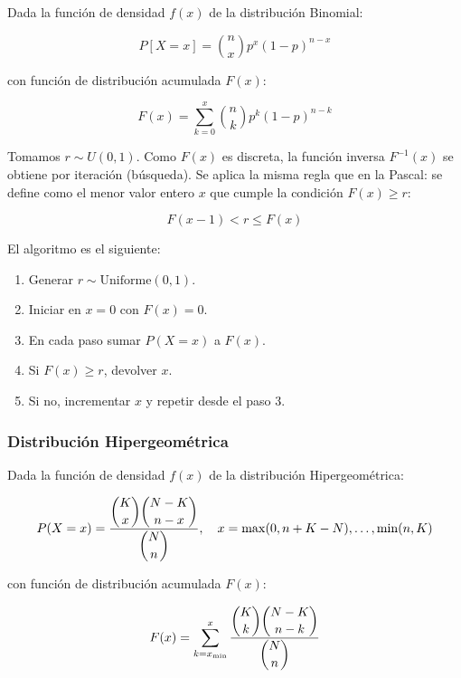 \documentclass{article}
\begin{document}
Dada la función de densidad $f(x)$ de la distribución Binomial:

\begin{equation}
    P[X = x] = \binom{n}{x} p^x (1-p)^{n-x}
\end{equation}

con función de distribución acumulada $F(x)$:

\begin{equation}
    F(x) = \sum_{k=0}^{x} \binom{n}{k} p^k (1-p)^{n-k}
\end{equation}

Tomamos $r \sim U(0,1)$. Como $F(x)$ es discreta, la función inversa $F^{-1}(x)$ se obtiene
por iteración (búsqueda). Se aplica la misma regla que en la Pascal: se define como el
menor valor entero $x$ que cumple la condición $F(x) \geq r$:

\begin{equation}
    F(x-1) < r \leq F(x)
\end{equation}

El algoritmo es el siguiente:

\begin{enumerate}
    \item Generar $r \sim \mathrm{Uniforme}(0,1)$.
    \item Iniciar en $x = 0$ con $F(x) = 0$.
    \item En cada paso sumar $P(X = x)$ a $F(x)$.
    \item Si $F(x) \geq r$, devolver $x$.
    \item Si no, incrementar $x$ y repetir desde el paso 3.
\end{enumerate}


\subsubsection{Distribución Hipergeométrica}

Dada la función de densidad $f(x)$ de la distribución Hipergeométrica:

\begin{equation}
    P(X = x) = \frac{\dbinom{K}{x}\dbinom{N-K}{n-x}}{\dbinom{N}{n}},
    \quad x = \max(0, n + K - N), \ldots, \min(n, K)
\end{equation}

con función de distribución acumulada $F(x)$:

\begin{equation}
    F(x) = \sum_{k=x_{\min}}^{x} \frac{\dbinom{K}{k}\dbinom{N-K}{n-k}}{\dbinom{N}{n}}
\end{equation}
\end{document}
